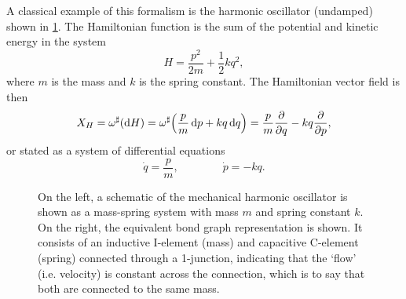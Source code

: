 A classical example of this formalism is the harmonic oscillator (undamped) shown in \cref{fig:ho}. The Hamiltonian function is the sum of the potential and kinetic energy in the system
\begin{equation}
     H = \frac{p^2}{2m} + \frac{1}{2}kq^2,
\end{equation}
where \(m\) is the mass and \(k\) is the spring constant. The Hamiltonian vector field is then 
\begin{equation}
     X_H = \omega^\sharp\qty(\dd{H}) = \omega^\sharp\qty(\frac{p}{m}\dd{p} + kq\dd{q}) = \frac{p}{m}\pdv{}{q} - kq \pdv{}{p},
\end{equation}
or stated as a system of differential equations
\begin{equation}
     \dot{q} = \frac{p}{m}, \qquad \qquad \dot{p} = -kq.
\end{equation}
\begin{figure}[ht]
    \centering
    
    \caption{On the left, a schematic of the mechanical harmonic oscillator is shown as a mass-spring system with mass \(m\) and spring constant \(k\). On the right, the equivalent bond graph representation is shown. It consists of an inductive I-element (mass) and capacitive C-element (spring) connected through a 1-junction, indicating that the `flow' (i.e. velocity) is constant across the connection, which is to say that both are connected to the same mass.}
    \label{fig:ho}
\end{figure}

